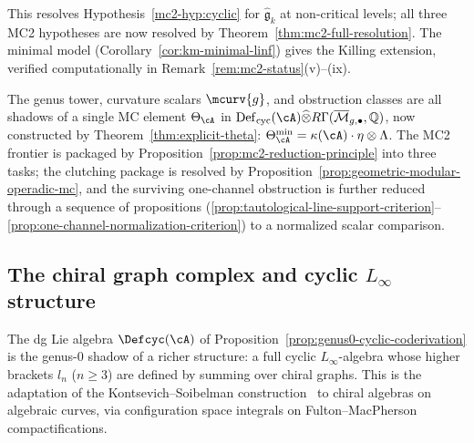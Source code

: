\begin{remark}
\label{rem:mc2-1-km-scope}
This resolves Hypothesis~\ref{mc2-hyp:cyclic} for
$\widehat{\mathfrak{g}}_k$ at non-critical levels; all three MC2
hypotheses are now resolved by
Theorem~\ref{thm:mc2-full-resolution}.  The minimal model
(Corollary~\ref{cor:km-minimal-linf}) gives the Killing extension,
verified computationally in Remark~\ref{rem:mc2-status}(v)--(ix).
\end{remark}

\begin{remark}\label{rem:def-cyc-role}
The genus tower, curvature scalars $\mcurv{g}$, and obstruction
classes are all shadows of a single MC element $\Theta_\cA$ in
$\operatorname{Def}_{\mathrm{cyc}}(\cA) \widehat{\otimes}
R\Gamma(\overline{\mathcal{M}}_{g,\bullet}, \mathbb{Q})$,
now constructed by Theorem~\ref{thm:explicit-theta}:
$\Theta_\cA^{\min} = \kappa(\cA) \cdot \eta \otimes \Lambda$.
The MC2 frontier is packaged by
Proposition~\ref{prop:mc2-reduction-principle} into three tasks;
the clutching package is resolved by
Proposition~\ref{prop:geometric-modular-operadic-mc}, and the
surviving one-channel obstruction is further reduced through a
sequence of propositions
(\ref{prop:tautological-line-support-criterion}--\ref{prop:one-channel-normalization-criterion})
to a normalized scalar comparison.
\end{remark}

\subsection{The chiral graph complex and cyclic
\texorpdfstring{$L_\infty$}{L-infinity} structure}
\label{subsec:chiral-graph-complex}

The dg Lie algebra $\Defcyc(\cA)$ of
Proposition~\ref{prop:genus0-cyclic-coderivation} is the genus-$0$ shadow
of a richer structure: a full cyclic $L_\infty$-algebra whose higher
brackets $l_n$ ($n \geq 3$) are defined by summing over chiral
graphs.  This is the adaptation of the Kontsevich--Soibelman
construction~\cite{KontsevichSoibelman} to chiral algebras on algebraic
curves, via configuration space integrals on
Fulton--MacPherson compactifications.

